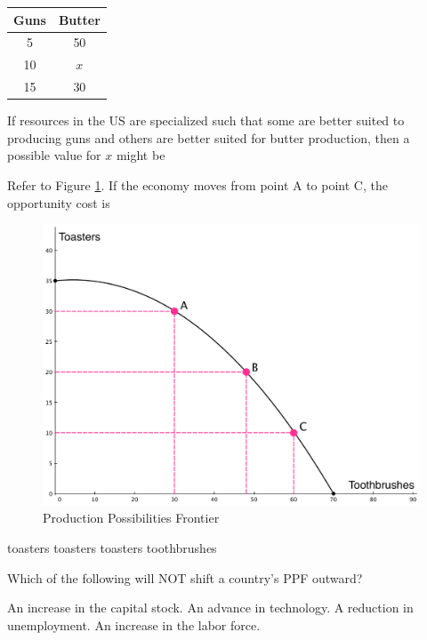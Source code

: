 \documentclass[addpoints,11pt]{exam}
\theoremstyle{definition}
\begin{document}
\begin{questions}
\begin{table}[H]
\begin{tabular}{  c| c}
			Guns & Butter \\
			\hline
			5 & 50 \\
			10 & $x$  \\
			15 & 30 \\
		\end{tabular}
		\label{MC22}
	\end{table}
	
	If resources in the US are specialized such that some are better suited to producing guns and others are better suited for butter production, then a possible value for $x$ might be
	
	\begin{choices}
	\end{choices}

			
	\question Refer to Figure \ref{fig1}. If the economy moves from point A to point C, the opportunity cost is
	
		\begin{figure}[H]
			\centering
			\includegraphics[scale=.3]{hw1_plot1.pdf}
			\caption{Production Possibilities Frontier}
			\label{fig1}
		\end{figure}
	
		\begin{choices}
			 toasters
			 toasters
			 toasters
			 toothbrushes
		\end{choices}
		
\question Which of the following will NOT shift a country's PPF outward?

\begin{choices}
	\choice An increase in the capital stock.
	\choice An advance in technology.
	\CorrectChoice A reduction in unemployment.
	\choice An increase in the labor force.
\end{choices}
	

\end{questions}
\end{document}
